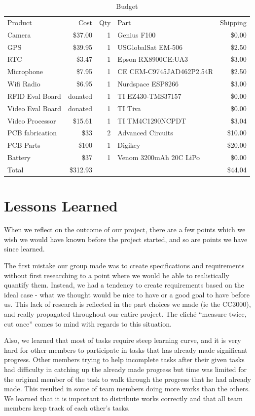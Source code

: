 \documentclass[12pt]{article}
\begin{document}
\begin{table}[h!]
    \centering
    \caption{Budget}
    \begin{tabular}{lrrlr}
        Product & Cost & Qty & Part & Shipping\\
        Camera & \$37.00 & 1 & Genius F100 & \$0.00\\
        GPS & \$39.95 & 1 & USGlobalSat EM-506 & \$2.50\\
        RTC & \$3.47 & 1 & Epson RX8900CE:UA3 & \$3.00\\
        Microphone & \$7.95 & 1 & CE CEM-C9745JAD462P2.54R & \$2.50\\
        Wifi Radio & \$6.95 & 1 & Nurdspace ESP8266 & \$3.00\\
        RFID Eval Board & donated & 1 & TI EZ430-TMS37157 & \$0.00\\
        Video Eval Board & donated & 1 & TI Tiva & \$0.00\\
        Video Processor & \$15.61 & 1 & TI TM4C1290NCPDT & \$3.04\\
        PCB fabrication & \$33 & 2 & Advanced Circuits & \$10.00\\
        PCB Parts & \$100 & 1 & Digikey & \$20.00\\
        Battery & \$37 & 1 & Venom 3200mAh 20C LiPo & \$0.00\\
        Total & \$312.93 & & & \$44.04\\
    \end{tabular}
\end{table}

\section{Lessons Learned}
When we reflect on the outcome of our project, there are a few points which we
wish we would have known before the project started, and so are points we have
since learned. 

The first mistake our group made was to create specifications and requirements
without first researching to a point where we would be able to realistically
quantify them. Instead, we had a tendency to create requirements based on the
ideal case - what we thought would be nice to have or a good goal to have
before us. This lack of research is reflected in the part choices we made (ie
the CC3000), and really propagated throughout our entire project. The cliché
“measure twice, cut once” comes to mind with regards to this situation.

Also, we learned that most of tasks require steep learning curve, and it is
very hard for other members to participate in tasks that has already made
significant progress. Other members trying to help incomplete tasks after their
given tasks had difficulty in catching up the already made progress but time
was limited for the original member of the task to walk through the progress
that he had already made. This resulted in some of team members doing more
works than the others. We learned that it is important to distribute works
correctly and that all team members keep track of each other’s tasks.
\end{document}
